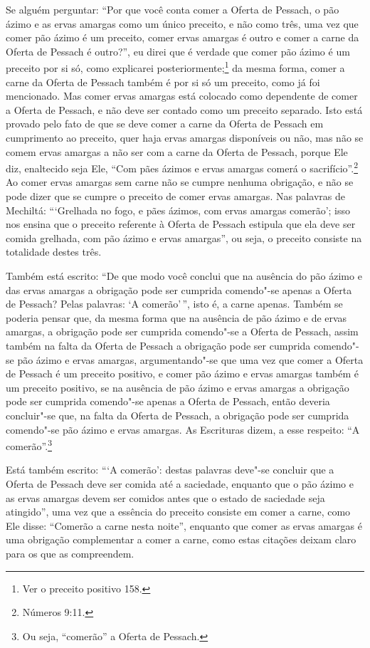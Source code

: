 \begin{multicols}{2}
Se alguém perguntar: ``Por que você conta comer a Oferta de Pessach\starr, o
pão ázimo e as ervas amargas como um único preceito, e não como três,
uma vez que comer pão ázimo é um preceito, comer ervas amargas é outro
e comer a carne da Oferta de Pessach\starr{} é outro?'', eu direi que é verdade
que comer pão ázimo é um preceito por si só, como explicarei
posteriormente;\footnote{Ver o preceito positivo 158.} da mesma forma, comer a carne da
Oferta de Pessach\starr{} também é por si só um preceito, como já foi
mencionado. Mas comer ervas amargas está colocado como dependente de
comer a Oferta de Pessach\starr, e não deve ser contado como um preceito
separado. Isto está provado pelo fato de que se deve comer a carne da
Oferta de Pessach\starr{} em cumprimento ao preceito, quer haja ervas amargas
disponíveis ou não, mas não se comem ervas amargas
a não ser com a carne da Oferta de Pessach\starr, porque Ele diz,
enaltecido seja Ele, ``Com pães ázimos e ervas amargas comerá o
sacrifício''.\footnote{Números 9:11.} Ao comer ervas amargas sem carne não se
cumpre nenhuma obrigação, e não se pode dizer que se cumpre o preceito
de comer ervas amargas. Nas palavras de Mechiltá\starr: ```Grelhada no fogo, e
pães ázimos, com ervas amargas comerão'; isso nos ensina que o preceito
referente à Oferta de Pessach\starr{} estipula que ela deve ser comida
grelhada, com pão ázimo e ervas amargas'', ou seja, o preceito consiste
na totalidade destes três.

Também está escrito: ``De que modo você conclui que na ausência do pão
ázimo e das ervas amargas a obrigação pode ser cumprida comendo"-se
apenas a Oferta de Pessach\starr? Pelas palavras: `A comerão'\,'', isto é, a
carne apenas. Também se poderia pensar que, da mesma forma que na
ausência de pão ázimo e de ervas amargas, a obrigação pode ser cumprida
comendo"-se a Oferta de Pessach\starr{}, assim também na falta da Oferta de
Pessach\starr{} a obrigação pode ser cumprida comendo"-se pão ázimo e ervas
amargas, argumentando"-se que uma vez que comer a Oferta de Pessach\starr{} é
um preceito positivo, e comer pão ázimo e ervas amargas também é um
preceito positivo, se na ausência de pão ázimo e ervas amargas a
obrigação pode ser cumprida comendo"-se apenas a Oferta de Pessach\starr,
então deveria concluir"-se que, na falta da Oferta de Pessach\starr, a
obrigação pode ser cumprida comendo"-se pão ázimo e ervas amargas. As
Escrituras dizem, a esse respeito: ``A comerão''.\footnote{Ou seja, ``comerão'' a Oferta de Pessach\starr.}

Está também escrito: ```A comerão': destas palavras deve"-se concluir que
a Oferta de Pessach\starr{} deve ser comida até a saciedade, enquanto que o pão
ázimo e as ervas amargas devem ser comidos antes que o estado de
saciedade seja atingido'', uma vez que a essência do preceito consiste
em comer a carne, como Ele disse: ``Comerão a carne nesta noite'',
enquanto que comer as ervas amargas é uma obrigação complementar a comer
a carne, como estas citações deixam claro para os que as compreendem.


\end{multicols}
